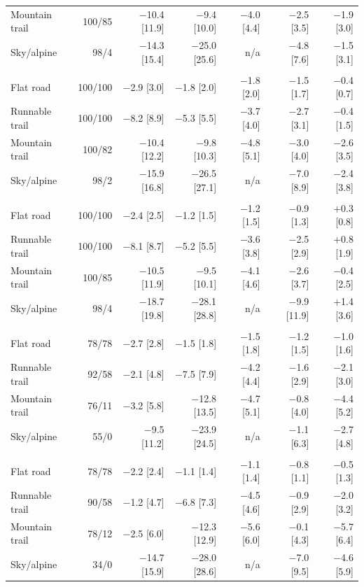 \begin{tabular}{@{}lrrrrrr@{}}
\quad Mountain trail & 100/85 & $-$10.4 [11.9] & $-$9.4 [10.0] & $-$4.0 [4.4] & $-$2.5 [3.5] & $-$1.9 [3.0] \\
\quad Sky/alpine & 98/4 & $-$14.3 [15.4] & $-$25.0 [25.6] & n/a & $-$4.8 [7.6] & $-$1.5 [3.1] \\
\addlinespace[3pt]
\multicolumn{7}{@{}l}{\textit{steeper altitude loss (quadratic)}} \\
\quad Flat road & 100/100 & $-$2.9 [3.0] & $-$1.8 [2.0] & $-$1.8 [2.0] & $-$1.5 [1.7] & $-$0.4 [0.7] \\
\quad Runnable trail & 100/100 & $-$8.2 [8.9] & $-$5.3 [5.5] & $-$3.7 [4.0] & $-$2.7 [3.1] & $-$0.4 [1.5] \\
\quad Mountain trail & 100/82 & $-$10.4 [12.2] & $-$9.8 [10.3] & $-$4.8 [5.1] & $-$3.0 [4.0] & $-$2.6 [3.5] \\
\quad Sky/alpine & 98/2 & $-$15.9 [16.8] & $-$26.5 [27.1] & n/a & $-$7.0 [8.9] & $-$2.4 [3.8] \\
\addlinespace[3pt]
\multicolumn{7}{@{}l}{\textit{accelerating drift (quadratic)}} \\
\quad Flat road & 100/100 & $-$2.4 [2.5] & $-$1.2 [1.5] & $-$1.2 [1.5] & $-$0.9 [1.3] & +0.3 [0.8] \\
\quad Runnable trail & 100/100 & $-$8.1 [8.7] & $-$5.2 [5.5] & $-$3.6 [3.8] & $-$2.5 [2.9] & +0.8 [1.9] \\
\quad Mountain trail & 100/85 & $-$10.5 [11.9] & $-$9.5 [10.1] & $-$4.1 [4.6] & $-$2.6 [3.7] & $-$0.4 [2.5] \\
\quad Sky/alpine & 98/4 & $-$18.7 [19.8] & $-$28.1 [28.8] & n/a & $-$9.9 [11.9] & +1.4 [3.6] \\
\addlinespace[3pt]
\multicolumn{7}{@{}l}{\textit{overlapping walk/run cadence}} \\
\quad Flat road & 78/78 & $-$2.7 [2.8] & $-$1.5 [1.8] & $-$1.5 [1.8] & $-$1.2 [1.5] & $-$1.0 [1.6] \\
\quad Runnable trail & 92/58 & $-$2.1 [4.8] & $-$7.5 [7.9] & $-$4.2 [4.4] & $-$1.6 [2.9] & $-$2.1 [3.0] \\
\quad Mountain trail & 76/11 & $-$3.2 [5.8] & $-$12.8 [13.5] & $-$4.7 [5.1] & $-$0.8 [4.0] & $-$4.4 [5.2] \\
\quad Sky/alpine & 55/0 & $-$9.5 [11.2] & $-$23.9 [24.5] & n/a & $-$1.1 [6.3] & $-$2.7 [4.8] \\
\addlinespace[3pt]
\multicolumn{7}{@{}l}{\textit{all of the above ($+10$\,\%)}} \\
\quad Flat road & 78/78 & $-$2.2 [2.4] & $-$1.1 [1.4] & $-$1.1 [1.4] & $-$0.8 [1.1] & $-$0.5 [1.3] \\
\quad Runnable trail & 90/58 & $-$1.2 [4.7] & $-$6.8 [7.3] & $-$4.5 [4.6] & $-$0.9 [2.9] & $-$2.0 [3.2] \\
\quad Mountain trail & 78/12 & $-$2.5 [6.0] & $-$12.3 [12.9] & $-$5.6 [6.0] & $-$0.1 [4.3] & $-$5.7 [6.4] \\
\quad Sky/alpine & 34/0 & $-$14.7 [15.9] & $-$28.0 [28.6] & n/a & $-$7.0 [9.5] & $-$4.6 [5.9] \\
\bottomrule
\end{tabular}